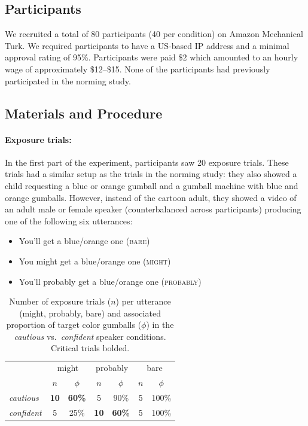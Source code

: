 \documentclass[lucida,biblatex]{sp} %
\begin{document}
\subsection{Participants}
We recruited a total of 80 participants (40 per condition) on Amazon Mechanical Turk. 
We required participants to have a US-based IP address and a minimal approval rating 
of 95\%. Participants were paid \$2 which amounted to an hourly wage of approximately 
\$12--\$15. None of the participants had previously participated in the norming study.

\subsection{Materials and Procedure}

\paragraph{Exposure trials:} In the first part of the experiment, participants saw 20 exposure trials. 
These trials had a similar setup as the trials in the norming study: 
they also showed a child requesting a blue or orange gumball and a gumball machine with blue and orange gumballs. 
However, instead of the cartoon adult, they showed a video of an adult male or female speaker (counterbalanced across participants) producing one of the following six utterances:

\begin{itemize}
\item You'll get a blue/orange one (\textsc{bare})
\item You might get a blue/orange one (\textsc{might})
\item You'll probably get a blue/orange one (\textsc{probably})
\end{itemize}

\begin{table}
\centering
\begin{tabular}{l c c c c c c}
\toprule
& \multicolumn{2}{c}{\sc might} & \multicolumn{2}{c}{\sc probably} & \multicolumn{2}{c}{\sc bare}\\
& $n$ & $\phi$ & $n$ & $\phi$ & $n$ & $\phi$\\
\midrule
\emph{cautious} & {\bf 10} & {\bf 60\%} & 5 & 90\% & 5 & 100\%\\
\emph{confident} & 5 & 25\% & {\bf 10}  & {\bf 60\%} & 5  & 100\%\\  
\bottomrule
\end{tabular}
\caption{Number of exposure trials ($n$) per utterance ({\sc might}, {\sc probably}, {\sc bare}) 
and associated proportion of target color gumballs ($\phi$) in the \emph{cautious} vs.~\emph{confident} 
speaker conditions. Critical trials bolded. \label{tab:materials}}

\end{table}
\end{document}
